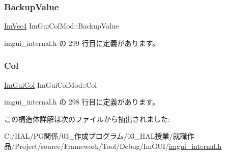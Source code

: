 \subsubsection{\texorpdfstring{Backup\+Value}{BackupValue}}
{\footnotesize\ttfamily \mbox{\hyperlink{struct_im_vec4}{Im\+Vec4}} Im\+Gui\+Col\+Mod\+::\+Backup\+Value}



 imgui\+\_\+internal.\+h の 299 行目に定義があります。

\mbox{\label{struct_im_gui_col_mod_aaa66ad29c378b8800098ab4d4e1c91a6}} 
\subsubsection{\texorpdfstring{Col}{Col}}
{\footnotesize\ttfamily \mbox{\hyperlink{imgui_8h_a1b0467ec582e731ae6292fef726fb5fe}{Im\+Gui\+Col}} Im\+Gui\+Col\+Mod\+::\+Col}



 imgui\+\_\+internal.\+h の 298 行目に定義があります。



この構造体詳解は次のファイルから抽出されました\+:\begin{DoxyCompactItemize}
\item 
C\+:/\+H\+A\+L/\+P\+G関係/03\+\_\+作成プログラム/03\+\_\+\+H\+A\+L授業/就職作品/\+Project/source/\+Framework/\+Tool/\+Debug/\+Im\+G\+U\+I/\mbox{\hyperlink{imgui__internal_8h}{imgui\+\_\+internal.\+h}}\end{DoxyCompactItemize}
